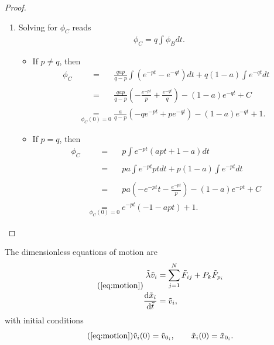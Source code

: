 \begin{proof}
\begin{enumerate}
\begin{itemize}
        \end{itemize}

        \item Solving for $\phi_C$ reads
        \begin{align*}
            \phi_C = q\int\phi_B dt.
        \end{align*}

        \begin{itemize}
            
            \item If $p\neq q$, then
            \begin{align*}
                \phi_C &\underset{\phantom{\phi_B(0) = 0}}{=}
                \frac{qap}{q-p}\int{(e^{-pt}-e^{-qt})dt}+q(1-a)\int{e^{-qt}dt}\\
                &\underset{\phantom{\phi_B(0) = 0}}{=}
                \frac{qap}{q-p}\left(-\frac{e^{-pt}}{p}+\frac{e^{-qt}}{q}\right) - (1-a)e^{-qt} + C\\
                &\underset{\phi_C(0) = 0}{=}
                \frac{a}{q-p}\left(-qe^{-pt}+pe^{-qt}\right) - (1-a)e^{-qt} + 1.
            \end{align*}

            \item If $p=q$, then
            \begin{align*}
                \phi_C &\underset{\phantom{\phi_B(0) = 0}}{=}p\int{e^{-pt}(apt + 1 - a) dt}\\
                &\underset{\phantom{\phi_B(0) = 0}}{=}
                pa\int{e^{-pt}pt dt} + p(1 - a)\int{e^{-pt}dt}\\
                &\underset{\phantom{\phi_B(0) = 0}}{=}
                pa\left( -e^{-pt}t - \frac{e^{-pt}}{p}\right) - (1-a)e^{-pt} + C\\
                &\underset{\phi_C(0)=0}{=} 
                e^{-pt}\left(-1-apt\right) + 1.
            \end{align*}
        \end{itemize}
    \end{enumerate}
\end{proof}


\begin{proposition}
    The dimensionless equations of motion are
    \begin{align}\tag{\ref{eq:motion}}
        \begin{aligned}
            \tilde \lambda \tilde v_i &=\sum_{j=1}^{N}\tilde F_{ij} + P_k \tilde F_{p_i}\\
            \frac{\diff \tilde x_i}{\diff\tilde t} &=\tilde v_i,
        \end{aligned}
    \end{align}
    with initial conditions
    \begin{equation}\tag{\ref{eq:motion}}
        \tilde v_i(0) = \tilde v_{0_i}, \qquad \tilde x_i(0) = \tilde x_{0_i}.
    \end{equation}
\end{proposition}

